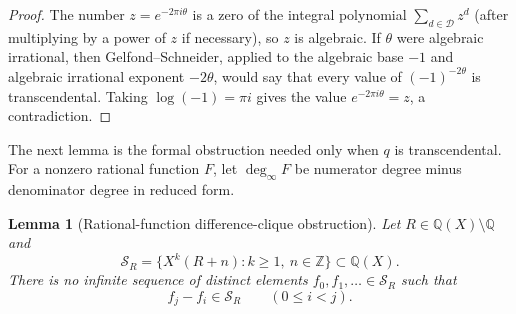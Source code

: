 \documentclass[11pt]{article}
\newtheorem{lemma}[theorem]{Lemma}
\newcommand{\Z}{\mathbb Z}
\newcommand{\Q}{\mathbb Q}
\begin{document}
\begin{proof}
The number $z=e^{-2\pi i\theta}$ is a zero of the integral polynomial
$\sum_{d\in\mathcal D}z^d$ (after multiplying by a power of $z$ if
necessary), so $z$ is algebraic.  If $\theta$ were algebraic irrational,
then Gelfond--Schneider, applied to the algebraic base $-1$ and algebraic
irrational exponent $-2\theta$, would say that every value of
$(-1)^{-2\theta}$ is transcendental.  Taking $\log(-1)=\pi i$ gives the
value $e^{-2\pi i\theta}=z$, a contradiction.
\end{proof}

The next lemma is the formal obstruction needed only when $q$ is
transcendental.  For a nonzero rational function $F$, let
$\deg_\infty F$ be numerator degree minus denominator degree in reduced form.

\begin{lemma}[Rational-function difference-clique obstruction]
\label{lem:formal}
Let $R\in\Q(X)\setminus\Q$ and
\[
 \mathcal S_R=\{X^k(R+n):k\geq1,\ n\in\Z\}\subset\Q(X).
\]
There is no infinite sequence of distinct elements
 $f_0,f_1,\ldots\in\mathcal S_R$ such that
\begin{equation}\label{eq:formalclique}
 f_j-f_i\in\mathcal S_R\qquad(0\leq i<j).
\end{equation}
\end{lemma}
\end{document}
